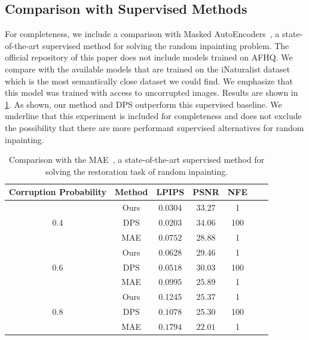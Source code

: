 \documentclass{article}
\begin{document}
\subsection{Comparison with Supervised Methods}
\label{sec:supervised_comp}
For completeness, we include a comparison with Masked AutoEncoders~\citep{mae}, a state-of-the-art supervised method for solving the random inpainting problem. The official repository of this paper does not include models trained on AFHQ. We compare with the available models that are trained on the iNaturalist dataset which is the most semantically close dataset we could find. We emphasize that this model was trained with access to uncorrupted images. Results are shown in \ref{table:comp_supervised_methods}. As shown, our method and DPS outperform this supervised baseline. We underline that this experiment is included for completeness and does not exclude the possibility that there are more performant supervised alternatives for random inpainting.

\begin{table}[htp]
\centering
\begin{tabular}{@{}ccccccc@{}}
\toprule
\textbf{Corruption Probability} & \textbf{Method} & \textbf{LPIPS} & \textbf{PSNR} & \textbf{NFE} \\ \midrule
\multirow{3}{*}{0.4} & Ours & 0.0304 & 33.27 & 1\\ 
& DPS & $\bm{0.0203}$ & $\bm{34.06}$ & 100\\
& MAE & $0.0752$ & $28.88$ & 1\\
\hline
\multirow{3}{*}{0.6} & Ours & 0.0628 & 29.46 & 1\\ 
& DPS & $\bm{0.0518}$ & $\bm{30.03}$ & 100\\ 
& MAE & $0.0995$ & $25.89$ & 1\\
\hline 
\multirow{3}{*}{0.8} & Ours & 0.1245 & $\bm{25.37}$ & 1\\ 
& DPS & $\bm{0.1078}$ & 25.30 & 100\\ 
& MAE & $0.1794$ & $22.01$ & 1 \\
\bottomrule
\end{tabular}
\vspace{1em}
\caption{Comparison with the MAE~\citep{mae}, a state-of-the-art supervised method for solving the restoration task of random inpainting.}
\label{table:comp_supervised_methods}
\end{table}
\end{document}
